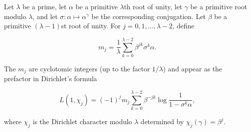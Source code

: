 Let $\lambda$ be a prime, let $\alpha$ be a primitive $\lambda$th root of unity, let $\gamma$ be a primitive root modulo $\lambda$, and let $\sigma : \alpha \mapsto \alpha^\gamma$ be the corresponding conjugation. Let $\beta$ be a primitive $(\lambda-1)$st root of unity. For $j = 0, 1, \dots, \lambda-2$, define

$$m_j = \frac{1}{\lambda} \sum_{k=0}^{\lambda-2} \beta^{jk} \sigma^k \alpha.$$

The $m_j$ are cyclotomic integers (up to the factor $1/\lambda$) and appear as the prefactor in Dirichlet's formula

$$L(1, \chi_j) = (-1)^j m_j \sum_{k=0}^{\lambda-2} \beta^{-jk} \log \frac{1}{1-\sigma^k \alpha},$$

where $\chi_j$ is the Dirichlet character modulo $\lambda$ determined by $\chi_j(\gamma) = \beta^j$.
